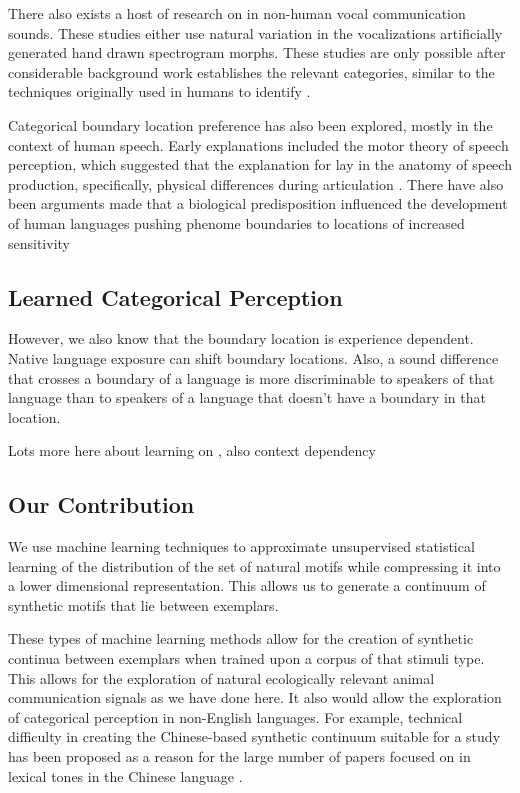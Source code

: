 There also exists a host of research on \CP in non-human vocal communication sounds. These studies either use
natural variation in the vocalizations
artificially generated hand drawn spectrogram morphs.
These studies are only possible after considerable background work establishes the relevant categories, similar to the techniques originally used in humans to identify \CP.

Categorical boundary location preference has also been explored, mostly in the context of human speech. Early explanations included the motor theory of speech perception, which suggested that the explanation for \CP lay in the anatomy of speech production, specifically, physical differences during articulation \cite{liberman1967perception}. There have also been arguments made that a biological predisposition influenced the development of human languages pushing phenome boundaries to locations of increased sensitivity \cite{stevens1981constraints, goldstone2010categorical, halle1979some}

\subsection{Learned Categorical Perception}

However, we also know that the boundary location is experience dependent. Native language exposure can shift boundary locations. Also, a sound difference that crosses a boundary of a language is more discriminable to speakers of that language than to speakers of a language that doesn’t have a boundary in that location.

Lots more here about learning on \CP, also context dependency

\subsection{Our Contribution}
We use machine learning techniques to approximate unsupervised statistical learning of the distribution of the set of natural motifs while compressing it into a lower dimensional representation. This allows us to generate a continuum of synthetic motifs that lie between exemplars.

These types of machine learning methods allow for the creation of synthetic continua between exemplars when trained upon a corpus of that stimuli type. This allows for the exploration of natural ecologically relevant animal communication signals as we have done here. It also would allow the exploration of categorical perception in non-English languages. For example, technical difficulty in creating the Chinese-based synthetic continuum suitable for a \CP study has been proposed as a reason for the large number of papers focused on \CP in lexical tones in the Chinese language \cite{zhang2013categorical}.

